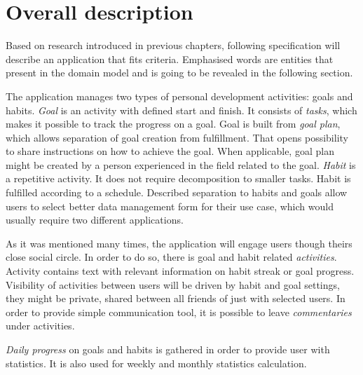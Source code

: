 
\section{Overall description}\label{sec:overall-description}

Based on research introduced in previous chapters, following specification will describe an application that fits criteria.
Emphasised words are entities that present in the domain model and is going to be revealed in the following section.

The application manages two types of personal development activities: goals and habits.
\textit{Goal} is an activity with defined start and finish.
It consists of \textit{tasks}, which makes it possible to track the progress on a goal.
Goal is built from \textit{goal plan}, which allows separation of goal creation from fulfillment.
That opens possibility to share instructions on how to achieve the goal.
When applicable, goal plan might be created by a person experienced in the field related to the goal.
\textit{Habit} is a repetitive activity.
It does not require decomposition to smaller tasks.
Habit is fulfilled according to a schedule.
Described separation to habits and goals allow users to select better data management form for their use case, which would usually require two different applications.

As it was mentioned many times, the application will engage users though theirs close social circle.
In order to do so, there is goal and habit related \textit{activities}.
Activity contains text with relevant information on habit streak or goal progress.
Visibility of activities between users will be driven by habit and goal settings, they might be private, shared between all friends of just with selected users.
In order to provide simple communication tool, it is possible to leave \textit{commentaries} under activities.

\textit{Daily progress} on goals and habits is gathered in order to provide user with statistics.
It is also used for weekly and monthly statistics calculation.